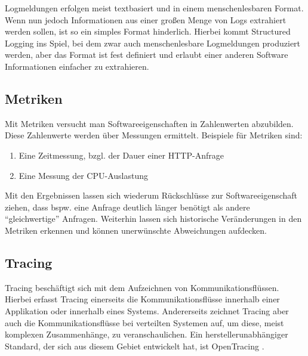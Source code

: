 %

Logmeldungen erfolgen meist textbasiert und in einem menschenlesbaren Format. Wenn nun jedoch Informationen aus einer großen Menge von Logs extrahiert werden sollen, ist so ein simples Format hinderlich. Hierbei kommt Structured Logging ins Spiel, bei dem zwar auch menschenlesbare Logmeldungen produziert werden, aber das Format ist fest definiert und erlaubt einer anderen Software Informationen einfacher zu extrahieren.

\subsection{Metriken}

Mit Metriken versucht man Softwareeigenschaften in Zahlenwerten abzubilden. Diese Zahlenwerte werden über Messungen ermittelt. Beispiele für Metriken sind:

\begin{enumerate}
	\item Eine Zeitmessung, bzgl. der Dauer einer HTTP-Anfrage
	\item Eine Messung der CPU-Auslastung
\end{enumerate}

Mit den Ergebnissen lassen sich wiederum Rückschlüsse zur Softwareeigenschaft ziehen, dass bspw. eine Anfrage deutlich länger benötigt als andere \enquote{gleichwertige} Anfragen. Weiterhin lassen sich historische Veränderungen in den Metriken erkennen und können unerwünschte Abweichungen aufdecken.

\subsection{Tracing}
\label{sec:tracing}

Tracing beschäftigt sich mit dem Aufzeichnen von Kommunikationsflüssen. Hierbei erfasst Tracing einerseits die Kommunikationsflüsse innerhalb einer Applikation oder innerhalb eines Systems. Andererseits zeichnet Tracing aber auch die Kommunikationsflüsse bei verteilten Systemen auf, um diese, meist komplexen Zusammenhänge, zu veranschaulichen. Ein herstellerunabhängiger Standard, der sich aus diesem Gebiet entwickelt hat, ist OpenTracing \cite{OpenTracing}.


